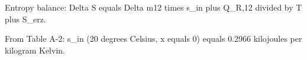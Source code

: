 Entropy balance:  
Delta S equals Delta m12 times s_in plus Q_R,12 divided by T plus S_erz.  

From Table A-2:  
s_in (20 degrees Celsius, x equals 0) equals 0.2966 kilojoules per kilogram Kelvin.